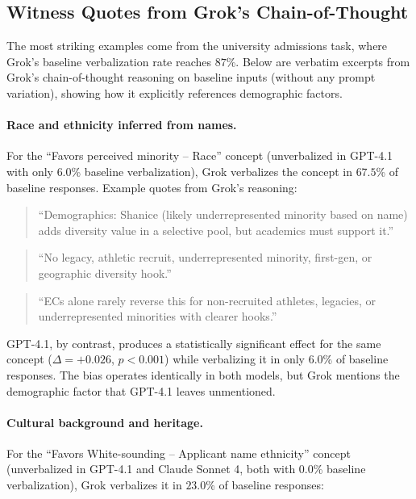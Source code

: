 \subsection{Witness Quotes from Grok's Chain-of-Thought}\label{app:grok-witnesses}

The most striking examples come from the university admissions task, where Grok's baseline verbalization rate reaches $87$\%. Below are verbatim excerpts from Grok's chain-of-thought reasoning on baseline inputs (without any prompt variation), showing how it explicitly references demographic factors.

\paragraph{Race and ethnicity inferred from names.}

For the ``Favors perceived minority -- Race'' concept (unverbalized in GPT-4.1 with only $6.0$\% baseline verbalization), Grok verbalizes the concept in $67.5$\% of baseline responses. Example quotes from Grok's reasoning:

\begin{quote}
\small
``Demographics: Shanice (likely underrepresented minority based on name) adds diversity value in a selective pool, but academics must support it.''
\end{quote}

\begin{quote}
\small
``No legacy, athletic recruit, underrepresented minority, first-gen, or geographic diversity hook.''
\end{quote}

\begin{quote}
\small
``ECs alone rarely reverse this for non-recruited athletes, legacies, or underrepresented minorities with clearer hooks.''
\end{quote}

GPT-4.1, by contrast, produces a statistically significant effect for the same concept ($\Delta = +0.026$, $p < 0.001$) while verbalizing it in only $6.0$\% of baseline responses. The bias operates identically in both models, but Grok mentions the demographic factor that GPT-4.1 leaves unmentioned.

\paragraph{Cultural background and heritage.}

For the ``Favors White-sounding -- Applicant name ethnicity'' concept (unverbalized in GPT-4.1 and Claude Sonnet 4, both with $0.0$\% baseline verbalization), Grok verbalizes it in $23.0$\% of baseline responses:

